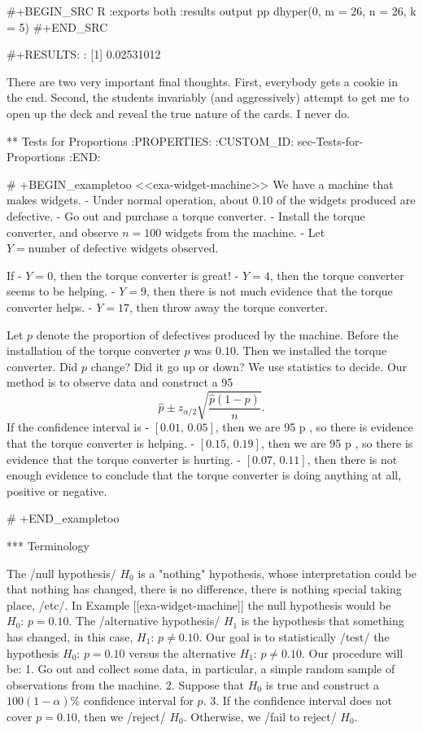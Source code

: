 #+BEGIN_SRC R :exports both :results output pp 
dhyper(0, m = 26, n = 26, k = 5)
#+END_SRC

#+RESULTS:
: [1] 0.02531012

There are two very important final thoughts. First, everybody gets a
cookie in the end. Second, the students invariably (and aggressively)
attempt to get me to open up the deck and reveal the true nature of
the cards. I never do.

** Tests for Proportions
:PROPERTIES:
:CUSTOM_ID: sec-Tests-for-Proportions
:END:

# +BEGIN_exampletoo
<<exa-widget-machine>>
We have a machine that makes widgets. 
- Under normal operation, about 0.10 of the widgets produced are
  defective.
- Go out and purchase a torque converter.
- Install the torque converter, and observe \(n=100\) widgets from the
  machine.
- Let \(Y=\mbox{number of defective widgets observed}\).

If
- \(Y=0\), then the torque converter is great!
- \(Y=4\), then the torque converter seems to be helping. 
- \(Y=9\), then there is not much evidence that the torque converter helps.
- \(Y=17\), then throw away the torque converter.

Let \(p\) denote the proportion of defectives produced by the
machine. Before the installation of the torque converter \(p\) was
\(0.10\). Then we installed the torque converter. Did \(p\) change?
Did it go up or down? We use statistics to decide. Our method is to
observe data and construct a 95%
\begin{equation}
\hat{p} \pm z_{\alpha/2}\sqrt{\frac{\hat{p}(1 - \hat{p})}{n}}.
\end{equation}
If the confidence interval is 
- \([0.01,\,0.05]\), then we are 95%
  p \), so there is evidence that the torque converter is
  helping.
- \([0.15,\,0.19]\), then we are 95%
  p \), so there is evidence that the torque converter is
  hurting.
- \([0.07,\,0.11]\), then there is not enough evidence to conclude
  that the torque converter is doing anything at all, positive or
  negative.

# +END_exampletoo

*** Terminology

The /null hypothesis/ \(H_{0}\) is a "nothing" hypothesis, whose
interpretation could be that nothing has changed, there is no
difference, there is nothing special taking place, /etc/. In Example
[[exa-widget-machine]] the null hypothesis would be \(H_{0}:\, p = 0.10.\)
The /alternative hypothesis/ \(H_{1}\) is the hypothesis that
something has changed, in this case, \(H_{1}:\, p \neq 0.10\). Our
goal is to statistically /test/ the hypothesis \(H_{0}:\, p = 0.10\)
versus the alternative \(H_{1}:\, p \neq 0.10\). Our procedure will
be:
1. Go out and collect some data, in particular, a simple random sample
   of observations from the machine.
2. Suppose that \(H_{0}\) is true and construct a \(100(1-\alpha)\%\)
   confidence interval for \(p\).
3. If the confidence interval does not cover \(p = 0.10\), then we
   /reject/ \(H_{0}\). Otherwise, we /fail to reject/ \(H_{0}\).

